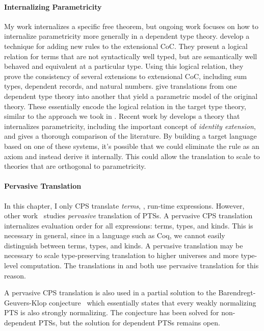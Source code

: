 \paragraph{Internalizing Parametricity}
My work internalizes a specific free theorem, but ongoing work focuses on how to internalize
parametricity more generally in a dependent type theory.
\citet{krishnaswami2013} develop a technique for adding new rules to the extensional CoC.
They present a logical relation for terms that are not syntactically well typed, but are
semantically well behaved and equivalent at a particular type.
Using this logical relation, they prove the consistency of several extensions to extensional CoC,
including sum types, dependent records, and natural numbers.
\citet{bernardy2012,keller2012} give translations from one dependent type theory
into another that yield a parametric model of the original theory.
These essentially encode the logical relation in the target type theory, similar to the approach we
took in .
Recent work by \citet{nuyts2017} develops a theory that internalizes parametricity, including the
important concept of \emph{identity extension}, and gives a thorough comparison of the literature.
By building a target language based on one of these systems, it's possible that
we could eliminate the rule  as an axiom and instead
derive it internally.
This could allow the translation to scale to theories that are orthogonal to
parametricity.

\paragraph{Pervasive Translation}
In this chapter, I only CPS translate \emph{terms}, \ie, run-time expressions.
However, other work~\cite{barthe2001} studies \emph{pervasive} translation of PTSs.
A pervasive CPS translation internalizes evaluation order for all
expressions: terms, types, and kinds. 
This is necessary in general, since in a language such as Coq, we cannot easily
distinguish between terms, types, and kinds.
A pervasive translation may be necessary to scale type-preserving translation to
higher universes and more type-level computation.
The translations in  and  both use
pervasive translation for this reason.

A pervasive CPS translation is also used in a partial solution to the
Barendregt-Geuvers-Klop conjecture~\cite{geuvers1993} which essentially states
that every weakly normalizing PTS is also strongly normalizing.
The conjecture has been solved for non-dependent PTSs, but the solution for
dependent PTSs remains open.
